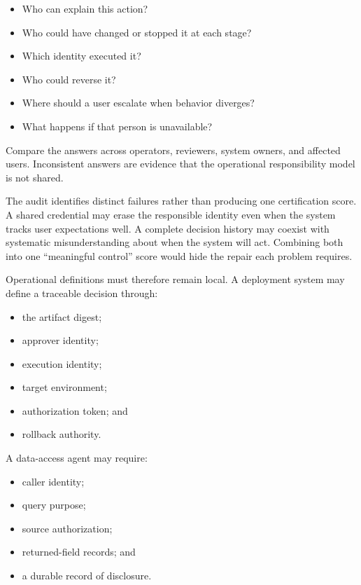 \begin{itemize}
\tightlist
\item
  Who can explain this action?
\item
  Who could have changed or stopped it at each stage?
\item
  Which identity executed it?
\item
  Who could reverse it?
\item
  Where should a user escalate when behavior diverges?
\item
  What happens if that person is unavailable?
\end{itemize}

Compare the answers across operators, reviewers, system owners, and affected users. Inconsistent answers are evidence that the operational responsibility model is not shared.

The audit identifies distinct failures rather than producing one certification score. A shared credential may erase the responsible identity even when the system tracks user expectations well. A complete decision history may coexist with systematic misunderstanding about when the system will act. Combining both into one ``meaningful control'' score would hide the repair each problem requires.

Operational definitions must therefore remain local. A deployment system may define a traceable decision through:

\begin{itemize}
\tightlist
\item
  the artifact digest;
\item
  approver identity;
\item
  execution identity;
\item
  target environment;
\item
  authorization token; and
\item
  rollback authority.
\end{itemize}

A data-access agent may require:

\begin{itemize}
\tightlist
\item
  caller identity;
\item
  query purpose;
\item
  source authorization;
\item
  returned-field records; and
\item
  a durable record of disclosure.
\end{itemize}

